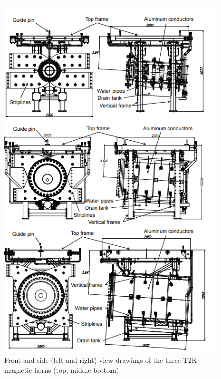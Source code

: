 \begin{figure}
    \includegraphics[width=\textwidth]{Figures/t2k_magnetic_horns.png}
    \caption{Front and side (left and right) view drawings of the three T2K magnetic horns (top, middle bottom).}
        \label{fig:magnetichorns}
\end{figure}

